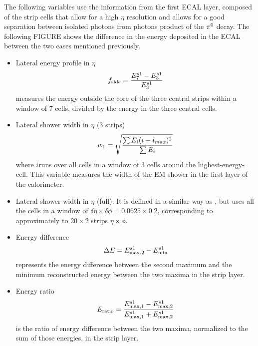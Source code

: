 The following variables use the information from the first \ac{ECAL} layer, composed of the strip cells that allow for a high \(\eta\) resolution and allows for a good separation between isolated photons from photons product of the \(\pi^{0}\) decay. The following FIGURE shows the difference in the energy deposited in the \ac{ECAL} between the two cases mentioned previously.
\begin{itemize}
    \item Lateral energy profile in \(\eta\)
        \begin{equation}
            f_{\text{side}} = \frac{E_7^{s1} - E_3^{s1}}{E_3^{s1}}
        \end{equation}
        measures the energy outside the core of the three central strips within a window of 7 cells, divided by the energy in the three central cells.
    \item Lateral shower width in \(\eta\) (3 strips)
        \begin{equation}
            w_{1} = \sqrt{
                \frac{\sum E_i (i - i_{max})^2}{\sum E_i}
            }
        \end{equation}
        where \(i\)runs over all cells in a window of 3 cells around the highest-energy-cell. This variable measures the width of the \ac{EM} shower in the first layer of the calorimeter.
    \item Lateral shower width in \(\eta\) (full).
        It is defined in a similar way as \wone, but uses all the cells in a window of \(\delta\eta\times\delta\phi=0.0625\times 0.2\), corresponding to approximately to \(20\times 2\) strips \(\eta\times\phi\).
    \item Energy difference
        \begin{equation}
            \Delta E = E_{\text{max}, 2}^{s1} - E_{\text{min}}^{s1}
        \end{equation}
        represents the energy difference between the second maximum and the minimum reconstructed energy between the two maxima in the strip layer.
    \item Energy ratio
        \begin{equation}
            E_{\text{ratio}} = \frac{
                E_{\text{max}, 1}^{s1} - E_{\text{max}, 2}^{s1}
            }{
                E_{\text{max}, 1}^{s1} + E_{\text{max}, 2}^{s1}
            }
        \end{equation}
        is the ratio of energy difference between the two maxima, normalized to the sum of those energies, in the strip layer.
\end{itemize}


